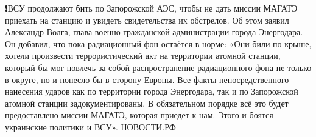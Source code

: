 ❗️ВСУ продолжают бить по Запорожской АЭС, чтобы не дать миссии МАГАТЭ приехать на станцию и увидеть свидетельства их обстрелов.
Об этом заявил Александр Волга, глава военно-гражданской администрации города Энергодара. Он добавил, что пока радиационный фон остаётся в норме:
«Они били по крыше, хотели произвести террористический акт на территории атомной станции, который бы мог повлечь за собой распространение радиационного фона не только в округе, но и понесло бы в сторону Европы.
Все факты непосредственного нанесения ударов как по территории города Энергодара, так и по Запорожской атомной станции задокументированы. В обязательном порядке всё это будет предоставлено миссии МАГАТЭ, которая приедет к нам. Этого и боятся украинские политики и ВСУ».
НОВОСТИ.РФ

